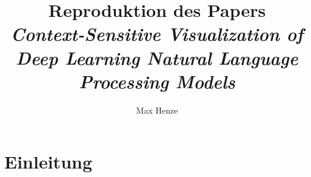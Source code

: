 \documentclass[DIV=13,fontsize=11pt]{scrartcl}
\begin{document}
\subject{Projektbericht zum Modul Data Mining Wintersemester 20221/2022}
\title{Reproduktion des Papers \\ \textit{Context-Sensitive Visualization of Deep Learning Natural Language Processing Models}\cite{dunn2021context}}
\author{Max Henze}%
\maketitle%

\section{Einleitung}


\end{document}
